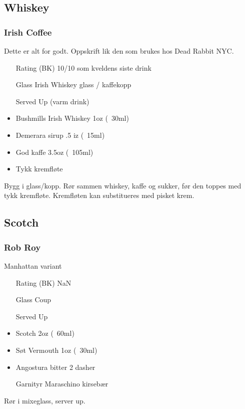 \subsection{Whiskey}
\subsubsection{Irish Coffee}
\label{drink:irish_coffee}
Dette er alt for godt. Oppskrift lik den som brukes hos Dead Rabbit NYC.
\begin{itemize}
    \item[Rating (BK)] 10/10 som kveldens siste drink
    \item[Glass] Irish Whiskey glass / kaffekopp
    \item[Served] Up (varm drink)
    \item Bushmills Irish Whiskey 1oz (~30ml)
    \item Demerara sirup .5 iz (~15ml)
    \item God kaffe 3.5oz (~105ml)
    \item Tykk kremfløte
\end{itemize}
Bygg i glass/kopp. Rør sammen whiskey, kaffe og sukker, før den toppes med tykk kremfløte. Kremfløten kan substitueres med pisket krem.

\subsection{Scotch}
\subsubsection{Rob Roy}
Manhattan variant
\begin{itemize}
    \item[Rating (BK)] NaN
    \item[Glass] Coup
    \item[Served] Up
    \item Scotch 2oz (~60ml)
    \item Søt Vermouth 1oz (~30ml)
    \item Angostura bitter 2 dasher
    \item[Garnityr] Maraschino kirsebær 
\end{itemize}
Rør i mixeglass, server up.

